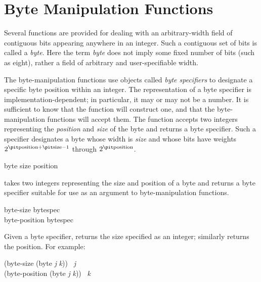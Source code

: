 \section{Byte Manipulation Functions}

Several functions are provided for dealing with an arbitrary-width field of
contiguous bits appearing anywhere in an integer.
Such a contiguous set of bits is called a {\it byte}.
Here the term {\it byte} does not imply some fixed number of bits
(such as eight), rather a field of arbitrary and user-specifiable width.

The byte-manipulation functions use objects called {\it byte specifiers} to
designate a specific byte position within an integer.
The representation of a byte specifier is implementation-dependent;
in particular, it may or may not be a number.
It is sufficient to know that the function  will construct one,
and that the byte-manipulation functions will accept them.
The function  accepts two integers representing
the {\it position} and {\it size} of the byte and returns
a byte specifier.
Such a specifier designates a byte whose width is {\it size}
and whose bits have weights \( 2^{\hbox{\scriptsize\it position}+\hbox{\scriptsize\it size}-1} \)
through \( 2^{\hbox{\scriptsize\it position}} \).

\begin{defun}[Function]
byte size position

 takes two integers representing the size and position
of a byte and returns a byte specifier suitable for use
as an argument to byte-manipulation functions.
\end{defun}

\begin{defun}[Function]
byte-size bytespec \\
byte-position bytespec

Given a byte specifier,  returns the size specified as an
integer;  similarly returns the position.
For example:
\begin{lisp}
(byte-size (byte {\it j} {\it k})) \EQ\ {\it j} \\
(byte-position (byte {\it j} {\it k})) \EQ\ {\it k}
\end{lisp}
\end{defun}

